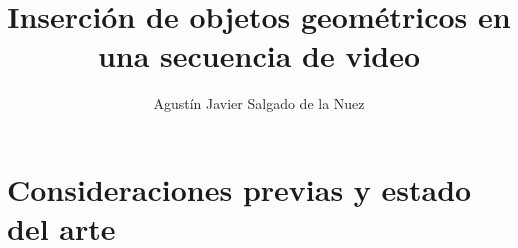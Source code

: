 \documentclass[12pt,spanish]{book}
\newlength{\defbaselineskip}
\newcommand{\setlinespacing}[1]
           {\setlength{\baselineskip}{#1 \defbaselineskip}}
\theoremstyle{plain}
\numberwithin{equation}{section}
\begin{document}



\nolistoftables \nolistoffigures \phd


 


\title{Inserci\'{o}n de objetos geom\'{e}tricos en una secuencia de video}
\author{Agust\'{i}n Javier Salgado de la Nuez}




\firstreader{}
{
\beforepreface
{} %
}
%

\setlinespacing{1.1}

{ 

}


\afterpreface

\pagestyle{headings}


 { 
 }


\part{Consideraciones previas y estado del arte}





\end{document}
